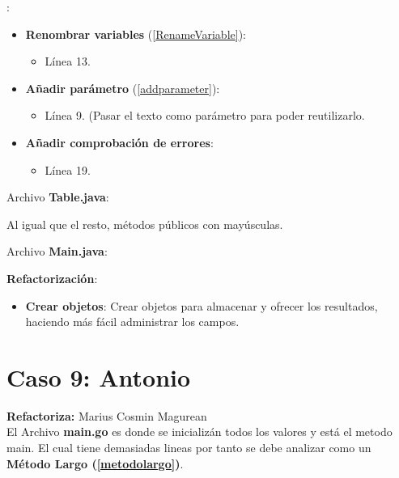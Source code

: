 \documentclass[11pt,a4paper,oneside]{book}
\begin{document}
:
\begin{itemize}
    \item \textbf{Renombrar variables} (\ref{RenameVariable}):
    \begin{itemize}
        \item Línea 13.
    \end{itemize}
    
    \item \textbf{Añadir parámetro} (\ref{addparameter}):
    \begin{itemize}
        \item Línea 9. (Pasar el texto como parámetro para poder reutilizarlo.
    \end{itemize}
    
    \item \textbf{Añadir comprobación de errores}:
    \begin{itemize}
        \item Línea 19.
    \end{itemize}
\end{itemize}

Archivo \textbf{Table.java}:


Al igual que el resto, métodos públicos con mayúsculas.

Archivo \textbf{Main.java}:


\textbf{Refactorización}:
\begin{itemize}
    \item \textbf{Crear objetos}: Crear objetos para almacenar y ofrecer los resultados, haciendo más fácil administrar los campos.
\end{itemize}



\chapter {Caso 9: Antonio}
\textbf{Refactoriza:} Marius Cosmin Magurean\\

El Archivo \textbf{main.go} es donde se inicializán todos los valores y está el metodo main.
El cual tiene demasiadas lineas por tanto se debe analizar como un
\textbf{Método Largo (\ref{metodolargo})}.

\end{document}

